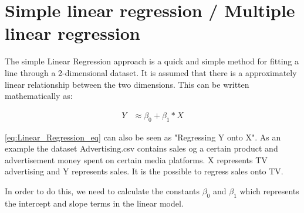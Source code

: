 \graphicspath{{Chapters/Indledning/}}

\chapter{Simple linear regression / Multiple linear regression}

The simple Linear Regression approach is a quick and simple method for fitting a line through a 2-dimensional dataset. It is assumed that there is a approximately linear relationship between the two dimensions. This can be written mathematically as:

\begin{equation} \label{eq:Linear_Regression_eq}
	\begin{split}
		Y & \approx \beta_0 + \beta_1 * X
	\end{split}
\end{equation} 

\cref{eq:Linear_Regression_eq} can also be seen as "Regressing Y onto X". As an example the dataset Advertising.csv contains sales og a certain product and advertisement money spent on certain media platforms. X represents TV advertising and Y represents sales. It is the possible to regress sales onto TV. 

In order to do this, we need to calculate the constants $\beta_0$ and $\beta_1$ which represents the intercept and slope terms in the linear model. 